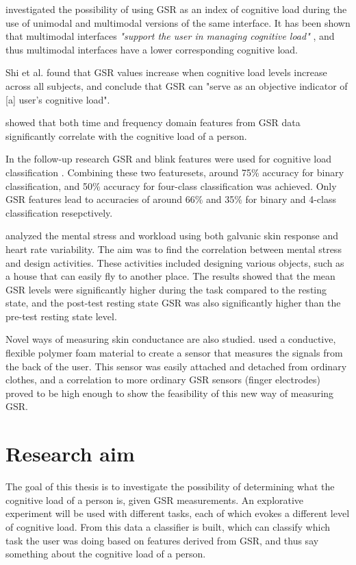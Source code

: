 \documentclass[11pt,leqno,a4paper]{report} %
\begin{document}
\citet{Shi2007} investigated the possibility of using GSR as an index of cognitive load during the use of unimodal and multimodal versions of the same interface. It has been shown that multimodal interfaces \textit{"support the user in managing cognitive load"} \citep{Oviatt2004}, and thus multimodal interfaces have a lower corresponding cognitive load. 

Shi et al. found that GSR values increase when cognitive load levels increase across all subjects, and conclude that GSR can "serve as an objective indicator of [a] user's cognitive load".

\citet{Nourbakhsh2012} showed that both time and frequency domain features from GSR data significantly correlate with the cognitive load of a person.

In the follow-up research GSR and blink features were used for cognitive load classification \citep{Nourbakhsh2013}. Combining these two featuresets, around 75\% accuracy for binary classification, and 50\% accuracy for four-class classification was achieved. Only GSR features lead to accuracies of around 66\% and 35\% for binary and 4-class classification resepctively.

\citet{library978540} analyzed the mental stress and workload using both galvanic skin response and heart rate variability. The aim was to find the correlation between mental stress and design activities. These activities included designing various objects, such as a house that can easily fly to another place. The results showed that the mean GSR levels were significantly higher during the task compared to the resting state, and the post-test resting state GSR was also significantly higher than the pre-test resting state level.

Novel ways of measuring skin conductance are also studied. \citet{A6945148} used a conductive, flexible polymer foam material to create a sensor that measures the signals from the back of the user. This sensor was easily attached and detached from ordinary clothes, and a correlation to more ordinary GSR sensors (finger electrodes) proved to be high enough to show the feasibility of this new way of measuring GSR.

\pagebreak

\section{Research aim}
The goal of this thesis is to investigate the possibility of determining what the cognitive load of a person is, given GSR measurements. An explorative experiment will be used with different tasks, each of which evokes a different level of cognitive load. From this data a classifier is built, which can classify which task the user was doing based on features derived from GSR, and thus say something about the cognitive load of a person.
\end{document}
